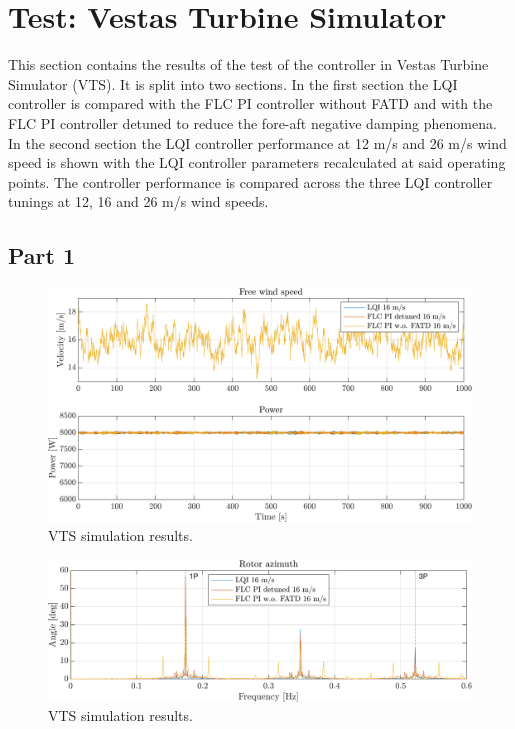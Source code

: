 \section{Test: Vestas Turbine Simulator} \label{sec:test_vts}
This section contains the results of the test of the controller in Vestas Turbine Simulator (VTS). It is split into two sections. In the first section the LQI controller is compared with the FLC PI controller without FATD and with the FLC PI controller detuned to reduce the fore-aft negative damping phenomena. In the second section the LQI controller performance at 12 m/s and 26 m/s wind speed is shown with the LQI controller parameters recalculated at said operating points. The controller performance is compared across the three LQI controller tunings at 12, 16 and 26 m/s wind speeds. 

\subsection{Part 1}


\begin{figure}[ht]
	\centering
	\includegraphics[width=0.7\linewidth]{Graphics/TestResults/VTSplotting/1_wind_pow.png}
	\caption{VTS simulation results.}
	\label{fig:vts_1_wind_pow}
\end{figure}

\begin{figure}[ht]
	\centering
	\includegraphics[width=0.7\linewidth]{Graphics/TestResults/VTSplotting/2_fftazi.png}
	\caption{VTS simulation results.}
	\label{fig:vts_2_fftazi}
\end{figure}

